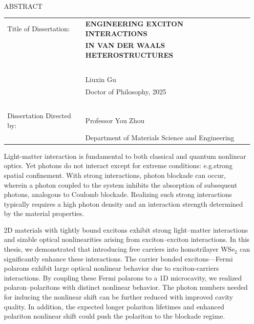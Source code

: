 
\hbox{\ } \vspace{.7in}
\renewcommand{\baselinestretch}{1}
\small \normalsize

\begin{center}
\large{{ABSTRACT}}

\vspace{3em}

\end{center}
\hspace{-.15in}
\begin{tabular}{ll}
Title of Dissertation:    & {\large \textbf{ENGINEERING EXCITON INTERACTIONS}}\\
&               {\large  \textbf{IN VAN DER WAALS HETEROSTRUCTURES}} \\
\ \\
&                          {\large  Liuxin Gu} \\
&                           {\large Doctor of Philosophy, 2025} \\
\ \\
Dissertation Directed by: & {\large  Professor You Zhou} \\
&               {\large  Department of Materials Science and Engineering } \\
\end{tabular}

\vspace{3em}

\renewcommand{\baselinestretch}{2}
\large \normalsize

Light-matter interaction is fundamental to both classical and quantum nonlinear optics. 
Yet photons do not interact except for extreme conditions: e.g.strong spatial confinement. 
With strong interactions, photon blockade can occur, wherein a photon coupled to the system inhibits the absorption of subsequent photons, analogous to Coulomb blockade. 
Realizing such strong interactions typically requires a high photon density and an interaction strength determined by the material properties.

2D materials with tightly bound excitons exhibit strong light–matter interactions and sizable optical nonlinearities arising from exciton–exciton interactions.
In this thesis, we demonstrated that introducing free carriers into homotrilayer WSe$_2$ can significantly enhance these interactions.
The carrier bonded excitons---Fermi polarons exhibit large optical nonlinear behavior due to exciton-carriers interactions.
By coupling these Fermi polarons to a 1D microcavity, we realized polaron--polaritons with distinct nonlinear behavior.
The photon numbers needed for inducing the nonlinear shift can be further reduced with improved cavity quality.
In addition, the expected longer polariton lifetimes and enhanced polariton nonlinear shift could push the polariton to the blockade regime.

